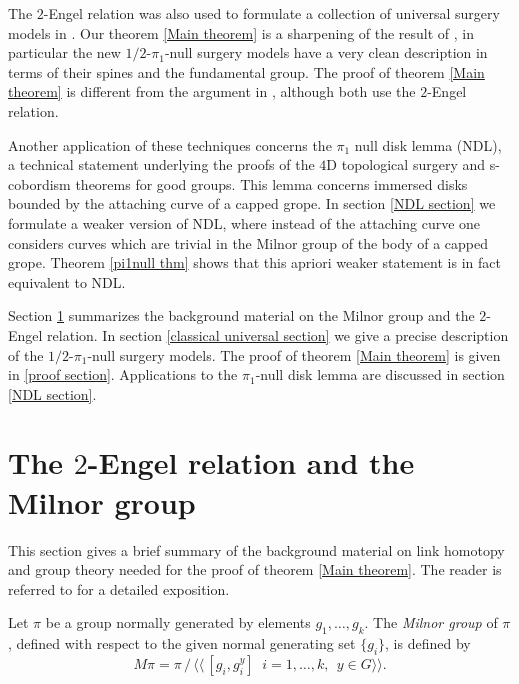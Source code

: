 \documentclass[12pt]{amsart}
\theoremstyle{definition}
\theoremstyle{remark}
\numberwithin{equation}{section}
\theoremstyle{plain}
\theoremstyle{definition}
\numberwithin{figure}{section}
\begin{document}
The $2$-Engel relation was also used to formulate a collection of universal surgery models in \cite[Section 7]{FK} . 
Our theorem \ref{Main theorem} is a sharpening of the result of \cite{FK}, in particular the new $1/2$-${\pi}_1$-null surgery models have a very clean description in terms of their spines and the fundamental group. The proof of theorem \ref{Main theorem} is different from the argument in \cite{FK}, although both use the $2$-Engel relation.





Another application of these techniques concerns the ${\pi}_1$ null disk lemma (NDL), a technical statement underlying the proofs of the $4$D topological surgery and s-cobordism theorems for good groups.  This lemma concerns immersed disks bounded by the attaching curve of a capped grope. In section \ref{NDL section} we formulate a weaker version of NDL, where instead of the attaching curve one considers curves which are trivial in the Milnor group of the body of a capped grope.
Theorem \ref{pi1null thm} shows that this apriori weaker statement is in fact equivalent to NDL.

Section \ref{Engel section} summarizes the background material on the Milnor group and the $2$-Engel relation.  
In section \ref{classical universal section} we give a precise description of the $1/2$-${\pi}_1$-null surgery models. The proof of theorem \ref{Main theorem} is given in \ref{proof section}. Applications to the  ${\pi}_1$-null disk lemma are discussed in section \ref{NDL section}.









\section{The $2$-Engel relation and the Milnor group} \label{Engel section}

 This section gives a brief summary of the background material on link homotopy and group theory needed for the proof of theorem \ref{Main theorem}. The reader is referred to \cite{M, FK} for a detailed exposition.

Let $\pi$ be a group normally generated by elements $g_1, \ldots,  g_k$. The 
{\em Milnor group} of ${\pi}$, defined with respect to the given normal generating set $\{ g_i\}$,
is defined by
\begin{equation} \label{Milnor group definition}
M{\pi} = {\pi} \, /\, \langle\! \langle \, [g_i, g_i^y] \;\; i=1,\ldots, k,  \; \, y \in G \rangle \! \rangle.
\end{equation}
\end{document}
